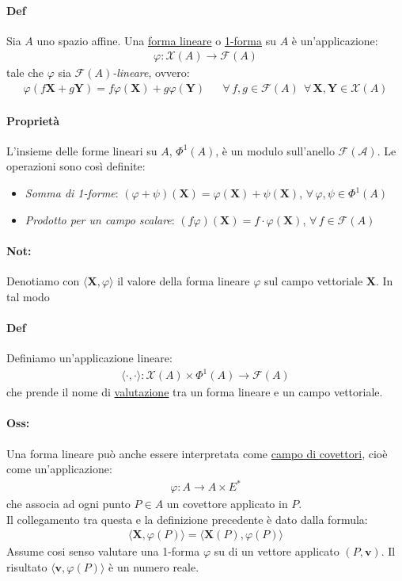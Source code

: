 \paragraph{Def} Sia $A$ uno spazio affine. Una \underline{forma lineare} o \underline{1-forma} su $A$ è un'applicazione:
\begin{align*}
    \varphi \colon \mathcal{X}(A)\to \mathcal{F}(A)
\end{align*}
tale che $\varphi$ sia \textit{$\mathcal{F}(A)$-lineare}, ovvero:
\begin{align*}
    \varphi(f\mathbf{X}+g\mathbf{Y})=f\varphi(\mathbf{X})+g\varphi(\mathbf{Y})&& \forall\, f,g\in \mathcal{F}(A)\:\:\forall \, \mathbf{X},\mathbf{Y}\in \mathcal{X}(A)
\end{align*}
\paragraph{Proprietà}L'insieme delle forme lineari su $A$, $\Phi^1(A)$, è un modulo sull'anello $\mathcal{F(A)}$. Le operazioni sono così definite:
\begin{itemize}
    \item \textit{Somma di 1-forme}: $(\varphi+ \psi)(\mathbf{X})=\varphi(\mathbf{X})+\psi(\mathbf{X})$, $\forall\, \varphi, \psi\in \Phi^1(A)$
    \item \textit{Prodotto per un campo scalare}: $(f\varphi)(\mathbf{X})=f\cdot \varphi(\mathbf{X})$, $\forall\, f \in \mathcal{F}(A)$
\end{itemize}
\paragraph{Not:} Denotiamo con $\langle \mathbf{X},\varphi\rangle $ il valore della forma lineare $\varphi$ sul campo vettoriale $\mathbf{X}$. In tal modo
\paragraph{Def} Definiamo un'applicazione lineare:
\begin{align*}
    \langle \cdot,\cdot\rangle  \colon \mathcal{X}(A)\times \Phi^1(A)\to \mathcal{F}(A)
\end{align*}
che prende il nome di \underline{valutazione} tra un forma lineare e un campo vettoriale.
\paragraph{Oss:} Una forma lineare può anche essere interpretata come \underline{campo di covettori}, cioè come un'applicazione:
\begin{align*}
    \varphi \colon A \to A \times E^*
\end{align*}
che associa ad ogni punto $P\in A$ un covettore applicato in $P$.\\
Il collegamento tra questa e la definizione precedente è dato dalla formula:
\begin{align*}
    \langle \mathbf{X},\varphi(P)\rangle =\langle \mathbf{X}(P),\varphi(P)\rangle 
\end{align*} 
Assume cosi senso valutare una 1-forma $\varphi$ su di un vettore applicato $(P,\mathbf{v})$. Il risultato $\langle \mathbf{v},\varphi(P)\rangle $ è un numero reale.
